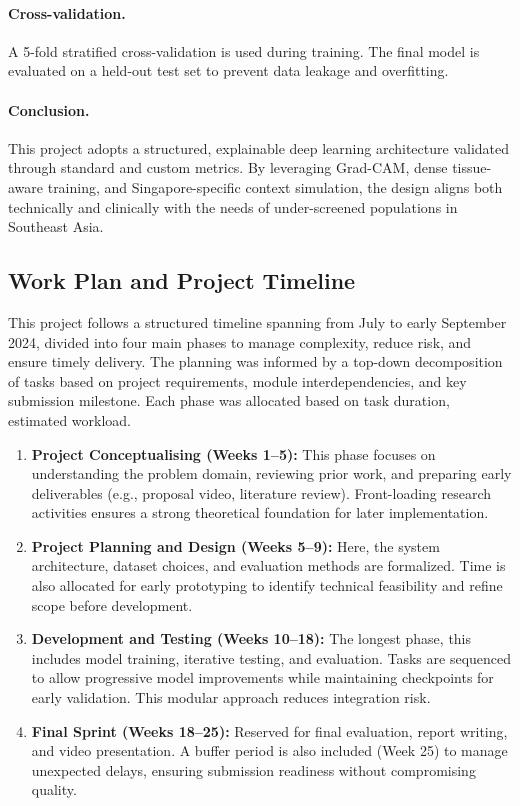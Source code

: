 \documentclass[12pt]{article}
\begin{document}
\paragraph{Cross-validation.}
A 5-fold stratified cross-validation is used during training. The final model is evaluated on a held-out test set to prevent data leakage and overfitting.

\vspace{1em}

\paragraph{Conclusion.}
This project adopts a structured, explainable deep learning architecture validated through standard and custom metrics. By leveraging Grad-CAM, dense tissue-aware training, and Singapore-specific context simulation, the design aligns both technically and clinically with the needs of under-screened populations in Southeast Asia.

\subsection{Work Plan and Project Timeline}

This project follows a structured timeline spanning from July to early September 2024, divided into four main phases to manage complexity, reduce risk, and ensure timely delivery. The planning was informed by a top-down decomposition of tasks based on project requirements, module interdependencies, and key submission milestone. Each phase was allocated based on task duration, estimated workload.

\begin{enumerate}
    \item \textbf{Project Conceptualising (Weeks 1–5):} This phase focuses on understanding the problem domain, reviewing prior work, and preparing early deliverables (e.g., proposal video, literature review). Front-loading research activities ensures a strong theoretical foundation for later implementation.

    \item \textbf{Project Planning and Design (Weeks 5–9):} Here, the system architecture, dataset choices, and evaluation methods are formalized. Time is also allocated for early prototyping to identify technical feasibility and refine scope before development.

    \item \textbf{Development and Testing (Weeks 10–18):} The longest phase, this includes model training, iterative testing, and evaluation. Tasks are sequenced to allow progressive model improvements while maintaining checkpoints for early validation. This modular approach reduces integration risk.

    \item \textbf{Final Sprint (Weeks 18–25):} Reserved for final evaluation, report writing, and video presentation. A buffer period is also included (Week 25) to manage unexpected delays, ensuring submission readiness without compromising quality.
\end{enumerate}
\end{document}

